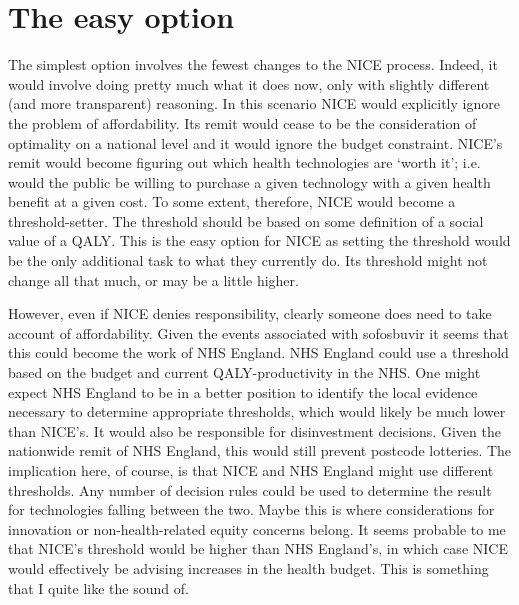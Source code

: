 \section{The easy option}
The simplest option involves the fewest changes to the NICE process. Indeed, it would involve doing pretty much what it does now, only with slightly different (and more transparent) reasoning. In this scenario NICE would explicitly ignore the problem of affordability. Its remit would cease to be the consideration of optimality on a national level and it would ignore the budget constraint. NICE's remit would become figuring out which health technologies are `worth it'; i.e. would the public be willing to purchase a given technology with a given health benefit at a given cost. To some extent, therefore, NICE would become a threshold-setter. The threshold should be based on some definition of a social value of a QALY. This is the easy option for NICE as setting the threshold would be the only additional task to what they currently do. Its threshold might not change all that much\cite{Donaldson_2011}, or may be a little higher\cite{Bobinac_2012}.

However, even if NICE denies responsibility, clearly someone does need to take account of affordability. Given the events associated with sofosbuvir it seems that this could become the work of NHS England. NHS England could use a threshold based on the budget and current QALY-productivity in the NHS. One might expect NHS England to be in a better position to identify the local evidence necessary to determine appropriate thresholds\cite{Appleby_2009}, which would likely be much lower than NICE's\cite{claxton2013methods}. It would also be responsible for disinvestment decisions. Given the nationwide remit of NHS England, this would still prevent postcode lotteries. The implication here, of course, is that NICE and NHS England might use different thresholds. Any number of decision rules could be used to determine the result for technologies falling between the two. Maybe this is where considerations for innovation or non-health-related equity concerns belong. It seems probable to me that NICE's threshold would be higher than NHS England's, in which case NICE would effectively be advising increases in the health budget. This is something that I quite like the sound of.